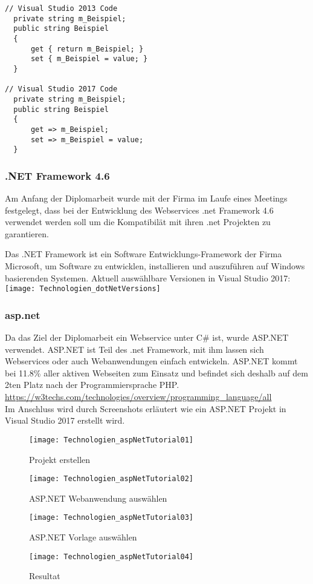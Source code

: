 \begin{lstlisting}[caption=Syntax Unterschied: Property , label=lst:test]
// Visual Studio 2013 Code
  private string m_Beispiel;
  public string Beispiel
  {
      get { return m_Beispiel; }
      set { m_Beispiel = value; }
  }

// Visual Studio 2017 Code
  private string m_Beispiel;
  public string Beispiel
  {
      get => m_Beispiel;
      set => m_Beispiel = value;
  }
\end{lstlisting}

\subsubsection {.NET Framework 4.6}
Am Anfang der Diplomarbeit wurde mit der Firma im Laufe eines Meetings festgelegt, dass bei der Entwicklung des Webservices .net Framework 4.6 verwendet werden soll um die Kompatibilät mit ihren .net Projekten zu garantieren.

Das .NET Framework ist ein Software Entwicklungs-Framework der Firma Microsoft, um Software zu entwicklen, installieren und auszuführen auf Windows basierenden Systemen. 
Aktuell auswählbare Versionen in Visual Studio 2017:\\ 

\centering \texttt{[image: Technologien\_dotNetVersions]}

\justifying
\subsubsection {asp.net}
Da das Ziel der Diplomarbeit ein Webservice unter C\# ist, wurde ASP.NET verwendet. ASP.NET ist Teil des .net Framework, mit ihm lassen sich Webservices oder auch Webanwendungen einfach entwickeln. ASP.NET kommt bei 11.8\% aller aktiven Webseiten zum Einsatz und befindet sich deshalb auf dem 2ten Platz nach der Programmiersprache PHP. 
\url {https://w3techs.com/technologies/overview/programming_language/all} 
\\
Im Anschluss wird durch Screenshots erläutert wie ein ASP.NET Projekt in Visual Studio 2017 erstellt wird.

\begin{figure}[H]
    \centering
    \texttt{[image: Technologien\_aspNetTutorial01]}
    \caption{Projekt erstellen}
    \label{fig:aspNetTut01}

    \centering
    \texttt{[image: Technologien\_aspNetTutorial02]}
    \caption{ASP.NET Webanwendung auswählen}
    \label{fig:aspNetTut02}
\end{figure}
\begin{figure}[H]
    \centering
    \texttt{[image: Technologien\_aspNetTutorial03]}
    \caption{ASP.NET Vorlage auswählen}
    \label{fig:aspNetTut03}

    \centering
    \texttt{[image: Technologien\_aspNetTutorial04]}
    \caption{Resultat}
    \label{fig:aspNetTut04}
\end{figure}

